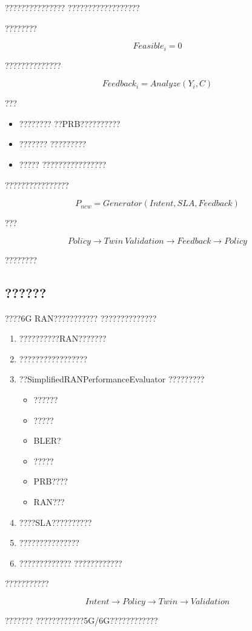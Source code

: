 ???????????????
??????????????????

????????

\begin{equation}
Feasible_i=0
\end{equation}

??????????????

\begin{equation}
Feedback_i
=
Analyze
(
Y_i,C
)
\end{equation}


???

\begin{itemize}
    \item ????????
    ??PRB??????????

    \item ???????
    ?????????

    \item ?????
    ????????????????
\end{itemize}


????????????????

\begin{equation}
P_{new}
=
Generator
(
Intent,
SLA,
Feedback
)
\end{equation}


???

\begin{equation}
Policy
\rightarrow
Twin\ Validation
\rightarrow
Feedback
\rightarrow
Policy
\end{equation}

????????



\subsection*{??????}

????6G RAN???????????
??????????????

\begin{enumerate}

\item ??????????RAN???????

\item ?????????????????

\item ??SimplifiedRANPerformanceEvaluator
?????????

\begin{itemize}
    \item ??????
    \item ?????
    \item BLER?
    \item ?????
    \item PRB????
    \item RAN???
\end{itemize}

\item ????SLA??????????

\item ???????????????

\item ?????????????
????????????
\end{enumerate}


???????????

\begin{equation}
Intent
\rightarrow
Policy
\rightarrow
Twin
\rightarrow
Validation
\end{equation}

???????
????????????5G/6G????????????